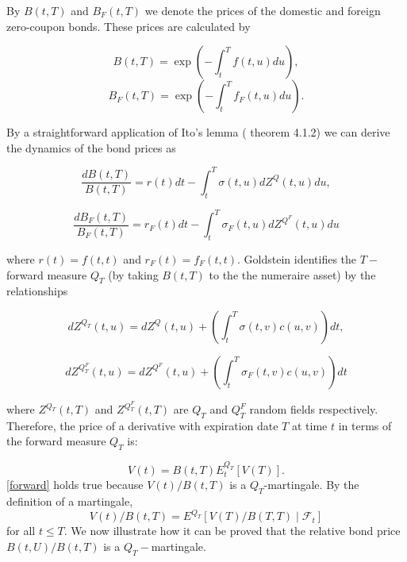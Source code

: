 \documentclass[11pt]{article}
\newcommand{\filt}{\ensuremath{\mathcal{F}}}
\begin{document}
By $B(t,T)$ and $B_F(t,T)$ we denote the prices of the domestic and foreign zero-coupon bonds. These prices are calculated by 

\begin{equation*}
    B(t,T)=\exp\left(-\int_t^T f(t,u)du\right),
\end{equation*}
\begin{equation*}
    B_F(t,T)=\exp\left(-\int_t^T f_F(t,u)du\right).
\end{equation*}

By a straightforward application of Ito's lemma (\cite{oks} theorem 4.1.2) we can derive the dynamics of the bond prices as

\begin{equation}\label{bonddynamics}
    \frac{dB(t,T)}{B(t,T)}=r(t)dt-\int_t^T \sigma(t,u)dZ^Q(t,u)du,
\end{equation}

\begin{equation}\label{fbonddynamics}
    \frac{dB_F(t,T)}{B_F(t,T)}=r_F(t)dt-\int_t^T \sigma_F(t,u)dZ^{Q^{F}}(t,u)du
\end{equation}


where $r(t)=f(t,t)$ and $r_F(t)=f_F(t,t)$. Goldstein \cite{goldstein2000term} identifies the $T-$ forward measure $Q_T$ (by taking $B(t,T)$ to the the numeraire asset) by the relationships

\begin{equation}\label{dzt}
    dZ^{Q_T}(t,u)=dZ^Q(t,u)+\left(\int_t^T\sigma(t,v)c(u,v)\right)dt,
\end{equation}

\begin{equation}\label{dzft}
    dZ^{Q^F_T}(t,u)=dZ^{Q^F}(t,u)+\left(\int_t^T\sigma_F(t,v)c(u,v)\right)dt
\end{equation}

where $Z^{Q_T}(t,T)$ and $Z^{Q^F_T}(t,T)$ are $Q_T$ and $Q_T^F$ random fields respectively. Therefore, the price of a derivative with expiration date $T$ at time $t$ in terms of the forward measure $Q_T$ is:

\begin{equation}\label{forward}
    V(t)=B(t,T)E^{Q_T}_t[V(T)].
\end{equation}
\eqref{forward} holds true because $V(t)/B(t,T)$ is a $Q_T$-martingale. By the definition of a martingale, $$V(t)/B(t,T)=E^{Q_T}[V(T)/B(T,T)\mid \filt_t]$$
for all $t\leq T.$ We now illustrate how it can be proved that the relative bond price $B(t,U)/B(t,T)$ is a $Q_T-$martingale. 
\end{document}

